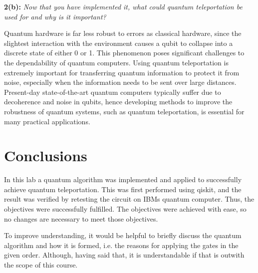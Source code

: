 \textbf{2(b):} \textit{Now that you have implemented it, what could quantum teleportation be used for and why is it important?}

Quantum hardware is far less robust to errors as classical hardware, since the slightest interaction with the environment causes a qubit to collapse into a discrete state of either 0 or 1. This phenomenon poses significant challenges to the dependability of quantum computers. Using quantum teleportation is extremely important for transferring quantum information to protect it from noise, especially when the information needs to be sent over large distances.
Present-day state-of-the-art quantum computers typically suffer due to decoherence and noise in qubits, hence developing methods to improve the robustness of quantum systems, such as quantum teleportation, is essential for many practical applications.

\section{Conclusions}

In this lab a quantum algorithm was implemented and applied to successfully achieve quantum teleportation. This was first performed using qiskit, and the result was verified by retesting the circuit on IBMs quantum computer. Thus, the objectives were successfully fulfilled. The objectives were achieved with ease, so no changes are necessary to meet those objectives.

To improve understanding, it would be helpful to briefly discuss the quantum algorithm and how it is formed, i.e. the reasons for applying the gates in the given order. Although, having said that, it is understandable if that is outwith the scope of this course.